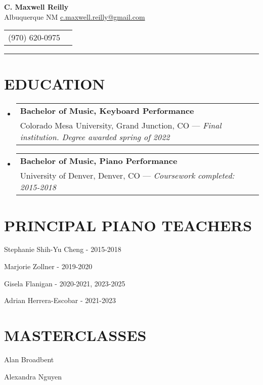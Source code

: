\documentclass{article}
\makeatletter
\newcommand{\cvItem}[1]{
        \item {
            {#1}
        }
    }
\newcommand{\cvSubHeadingListStart}{\begin{itemize}[leftmargin=0pt]}
\newcommand{\cvSubHeadingListEnd}{\end{itemize}}
\newcommand{\cvItemListStart}{\begin{itemize}[leftmargin=10pt]}
\newcommand{\cvItemListEnd}{\end{itemize}}
\newcommand{\cvEducationSubheading}[3]{
        \vspace{-1pt}\item[]
            \begin{tabular*}{1\textwidth}[t]{l@{\extracolsep{\fill}}r}
                \textbf{#1} \\ %
                {#2} %
                { --- \em #3} \\ %
            \end{tabular*}
    }
\makeatother
\begin{document}
    \setcounter{page}{1}
    \begin{center}
        \textbf{\Large C. Maxwell Reilly} \\ Albuquerque NM \hspace{2mm}
        \href{mailto:c.maxwell.reilly@gmail.com}{c.maxwell.reilly@gmail.com}
    \end{center}\vspace{-11pt}
    \begin{center}
        \begin{tabular}{c c}
            (970) 620-0975 \\
        \end{tabular}\vspace{-8pt}
    \end{center}
    \rule{\textwidth}{1pt}

    \section{EDUCATION}
        \cvSubHeadingListStart
            \cvEducationSubheading
                {Bachelor of Music, Keyboard Performance}
                {Colorado Mesa University, Grand Junction, CO}
                {Final institution. Degree awarded spring of 2022}
            \cvEducationSubheading
                {Bachelor of Music, Piano Performance}
                {University of Denver, Denver, CO}
                {Coursework completed: 2015-2018}
        \cvSubHeadingListEnd

    \section{PRINCIPAL PIANO TEACHERS}
        \cvItemListStart
            \begin{multicols}{2}
                \cvItem{Stephanie Shih-Yu Cheng - 2015-2018}
                \cvItem{Marjorie Zollner - 2019-2020}
                \cvItem{Gisela Flanigan - 2020-2021, 2023-2025}
                \cvItem{Adrian Herrera-Escobar - 2021-2023}
            \end{multicols}
        \cvItemListEnd

    \section{MASTERCLASSES}
        \cvItemListStart
            \begin{multicols}{2}
                \cvItem{Alan Broadbent}
                \cvItem{Alexandra Nguyen}
            \end{multicols}
        \cvItemListEnd
\end{document}
